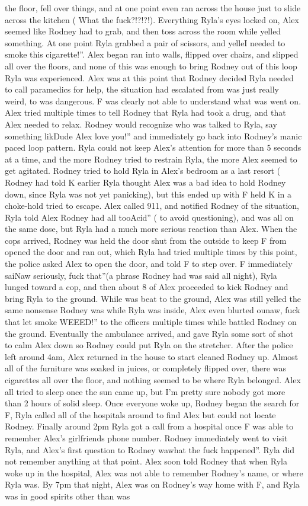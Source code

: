 \documentclass[12pt]{book}
\begin{document}
the floor, fell over things, and at one point even ran across the house just to slide across the kitchen ( What the fuck?!?!?!). Everything Ryla's eyes locked on, Alex seemed like Rodney had to grab, and then toss across the room while yelled something. At one point Ryla grabbed a pair of scissors, and yelleI needed to smoke this cigarette!''. Alex began ran into walls, flipped over chairs, and slipped all over the floors, and none of this was enough to bring Rodney out of this loop Ryla was experienced. Alex was at this point that Rodney decided Ryla needed to call paramedics for help, the situation had escalated from was just really weird, to was dangerous. F was clearly not able to understand what was went on. Alex tried multiple times to tell Rodney that Ryla had took a drug, and that Alex needed to relax. Rodney would recognize who was talked to Ryla, say something likDude Alex love you!'' and immediately go back into Rodney's manic paced loop pattern. Ryla could not keep Alex's attention for more than 5 seconds at a time, and the more Rodney tried to restrain Ryla, the more Alex seemed to get agitated. Rodney tried to hold Ryla in Alex's bedroom as a last resort ( Rodney had told K earlier Ryla thought Alex was a bad idea to hold Rodney down, since Ryla was not yet panicking), but this ended up with F held K in a choke-hold tried to escape. Alex called 911, and notified Rodney of the situation, Ryla told Alex Rodney had all tooAcid'' ( to avoid questioning), and was all on the same dose, but Ryla had a much more serious reaction than Alex. When the cops arrived, Rodney was held the door shut from the outside to keep F from opened the door and ran out, which Ryla had tried multiple times by this point, the police asked Alex to open the door, and told F to step over. F immediately saiNaw seriously, fuck that''(a phrase Rodney had was said all night), Ryla lunged toward a cop, and then about 8 of Alex proceeded to kick Rodney and bring Ryla to the ground. While was beat to the ground, Alex was still yelled the same nonsense Rodney was while Ryla was inside, Alex even blurted ounaw, fuck that let smoke WEEED!'' to the officers multiple times while battled Rodney on the ground. Eventually the ambulance arrived, and gave Ryla some sort of shot to calm Alex down so Rodney could put Ryla on the stretcher. After the police left around 4am, Alex returned in the house to start cleaned Rodney up. Almost all of the furniture was soaked in juices, or completely flipped over, there was cigarettes all over the floor, and nothing seemed to be where Ryla belonged. Alex all tried to sleep once the sun came up, but I'm pretty sure nobody got more than 2 hours of solid sleep. Once everyone woke up, Rodney began the search for F, Ryla called all of the hospitals around to find Alex but could not locate Rodney. Finally around 2pm Ryla got a call from a hospital once F was able to remember Alex's girlfriends phone number. Rodney immediately went to visit Ryla, and Alex's first question to Rodney wawhat the fuck happened''. Ryla did not remember anything at that point. Alex soon told Rodney that when Ryla woke up in the hospital, Alex was not able to remember Rodney's name, or where Ryla was. By 7pm that night, Alex was on Rodney's way home with F, and Ryla was in good spirits other than was 
\end{document}
